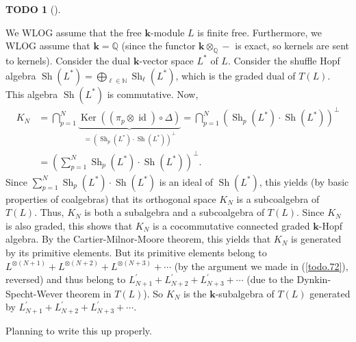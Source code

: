 \documentclass[numbers=enddot,12pt,final,onecolumn,notitlepage]{scrartcl}%
\theoremstyle{definition}
\newtheorem{quest}[theo]{TODO}
\newenvironment{todo}[1][]
{\begin{quest}[#1]\begin{leftbar}}
{\end{leftbar}\end{quest}}
\let\sumnonlimits\sum
\renewcommand{\sum}{\sumnonlimits\limits}
\begin{document}
\begin{todo}
We WLOG assume that the free $\mathbf{k}$-module $L$ is finite free.
Furthermore, we WLOG assume that $\mathbf{k}=\mathbb{Q}$ (since the functor
$\mathbf{k}\otimes_{\mathbb{Q}}-$ is exact, so kernels are sent to kernels).
Consider the dual $\mathbf{k}$-vector space $L^{\ast}$ of $L$. Consider the
shuffle Hopf algebra $\operatorname*{Sh}\left(  L^{\ast}\right)
=\bigoplus_{\ell\in\mathbb{N}}\operatorname*{Sh}\nolimits_{\ell}\left(
L^{\ast}\right)  $, which is the graded dual of $T\left(  L\right)  $. This
algebra $\operatorname*{Sh}\left(  L^{\ast}\right)  $ is commutative. Now,%
\begin{align*}
K_{N}  &  =\bigcap_{p=1}^{N}\underbrace{\operatorname*{Ker}\left(  \left(
\pi_{p}\otimes\operatorname*{id}\right)  \circ\Delta\right)  }_{=\left(
\operatorname*{Sh}\nolimits_{p}\left(  L^{\ast}\right)  \cdot
\operatorname*{Sh}\left(  L^{\ast}\right)  \right)  ^{\perp}}=\bigcap
_{p=1}^{N}\left(  \operatorname*{Sh}\nolimits_{p}\left(  L^{\ast}\right)
\cdot\operatorname*{Sh}\left(  L^{\ast}\right)  \right)  ^{\perp}\\
&  =\left(  \sum_{p=1}^{N}\operatorname*{Sh}\nolimits_{p}\left(  L^{\ast
}\right)  \cdot\operatorname*{Sh}\left(  L^{\ast}\right)  \right)  ^{\perp}.
\end{align*}
Since $\sum_{p=1}^{N}\operatorname*{Sh}\nolimits_{p}\left(  L^{\ast}\right)
\cdot\operatorname*{Sh}\left(  L^{\ast}\right)  $ is an ideal of
$\operatorname*{Sh}\left(  L^{\ast}\right)  $, this yields (by basic
properties of coalgebras) that its orthogonal space $K_{N}$ is a subcoalgebra
of $T\left(  L\right)  $. Thus, $K_{N}$ is both a subalgebra and a
subcoalgebra of $T\left(  L\right)  $. Since $K_{N}$ is also graded, this
shows that $K_{N}$ is a cocommutative connected graded $\mathbf{k}$-Hopf
algebra. By the Cartier-Milnor-Moore theorem, this yields that $K_{N}$ is
generated by its primitive elements. But its primitive elements belong to
$L^{\otimes\left(  N+1\right)  }+L^{\otimes\left(  N+2\right)  }%
+L^{\otimes\left(  N+3\right)  }+\cdots$ (by the argument we made in
(\ref{todo.72}), reversed) and thus belong to $L_{N+1}^{\prime}+L_{N+2}%
^{\prime}+L_{N+3}^{\prime}+\cdots$ (due to the Dynkin-Specht-Wever theorem in
$T\left(  L\right)  $). So $K_{N}$ is the $\mathbf{k}$-subalgebra of $T\left(
L\right)  $ generated by $L_{N+1}^{\prime}+L_{N+2}^{\prime}+L_{N+3}^{\prime
}+\cdots$.

Planning to write this up properly.
\end{todo}
\end{document}

